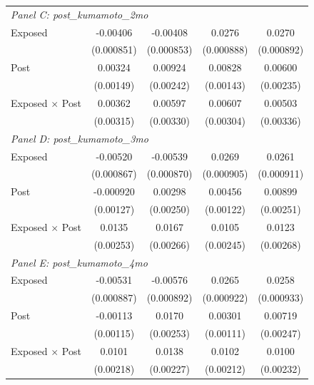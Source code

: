 \begin{table}[htbp]
\begin{tabular}{l*{4}{c}}
\multicolumn{5}{l}{\textit{Panel C: post\_kumamoto\_2mo}}\\

Exposed
&-0.00406\sym{***}
&-0.00408\sym{***}
&0.0276\sym{***}
&0.0270\sym{***}
\\
&(0.000851)&(0.000853)&(0.000888)&(0.000892)
\\

Post
&0.00324\sym{**}
&0.00924\sym{***}
&0.00828\sym{***}
&0.00600\sym{**}
\\
&(0.00149)&(0.00242)&(0.00143)&(0.00235)
\\

Exposed $\times$ Post
&0.00362
&0.00597\sym{*}
&0.00607\sym{**}
&0.00503
\\
&(0.00315)&(0.00330)&(0.00304)&(0.00336)

\\[0.1cm]
\midrule


\multicolumn{5}{l}{\textit{Panel D: post\_kumamoto\_3mo}}\\

Exposed
&-0.00520\sym{***}
&-0.00539\sym{***}
&0.0269\sym{***}
&0.0261\sym{***}
\\
&(0.000867)&(0.000870)&(0.000905)&(0.000911)
\\

Post
&-0.000920
&0.00298
&0.00456\sym{***}
&0.00899\sym{***}
\\
&(0.00127)&(0.00250)&(0.00122)&(0.00251)
\\

Exposed $\times$ Post
&0.0135\sym{***}
&0.0167\sym{***}
&0.0105\sym{***}
&0.0123\sym{***}
\\
&(0.00253)&(0.00266)&(0.00245)&(0.00268)

\\[0.1cm]
\midrule


\multicolumn{5}{l}{\textit{Panel E: post\_kumamoto\_4mo}}\\

Exposed
&-0.00531\sym{***}
&-0.00576\sym{***}
&0.0265\sym{***}
&0.0258\sym{***}
\\
&(0.000887)&(0.000892)&(0.000922)&(0.000933)
\\

Post
&-0.00113
&0.0170\sym{***}
&0.00301\sym{***}
&0.00719\sym{***}
\\
&(0.00115)&(0.00253)&(0.00111)&(0.00247)
\\

Exposed $\times$ Post
&0.0101\sym{***}
&0.0138\sym{***}
&0.0102\sym{***}
&0.0100\sym{***}
\\
&(0.00218)&(0.00227)&(0.00212)&(0.00232)


\end{tabular}
\end{table}
